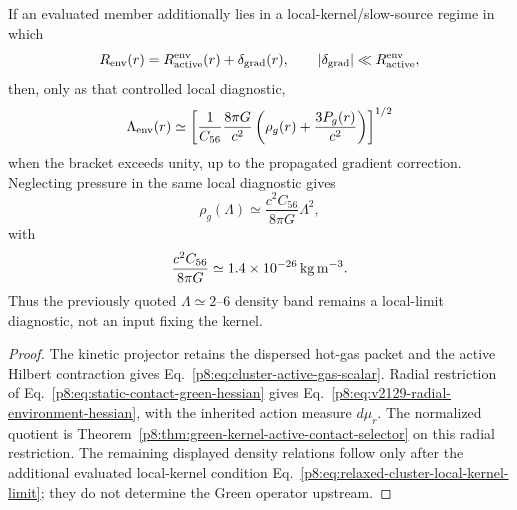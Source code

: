 \documentclass[12pt,a4paper]{article}
\begin{document}
\begin{corollary}
If an evaluated member additionally lies in a local-kernel/slow-source regime
in which
\begin{equation}
\label{p8:eq:relaxed-cluster-local-kernel-limit}
 R_{\rm env}(r)=R_{\rm active}^{\rm env}(r)+\delta_{\rm grad}(r),
 \qquad |\delta_{\rm grad}|\ll R_{\rm active}^{\rm env},
\end{equation}
then, only as that controlled local diagnostic,
\begin{equation}
\label{p8:eq:relaxed-cluster-Lambda-from-gas-density}
 \Lambda_{\rm env}(r)
 \simeq
 \left[\frac{1}{C_{56}}\frac{8\pi G}{c^2}
 \left(\rho_g(r)+\frac{3P_g(r)}{c^2}\right)\right]^{1/2}
\end{equation}
when the bracket exceeds unity, up to the propagated gradient correction.
Neglecting pressure in the same local diagnostic gives
\begin{equation}
\label{p8:eq:rho-cluster-Lambda-conversion}
 \rho_g(\Lambda)\simeq\frac{c^2C_{56}}{8\pi G}\Lambda^2,
\end{equation}
with
\begin{equation}
\label{p8:eq:cluster-density-uplift-scale}
 \frac{c^2C_{56}}{8\pi G}
 \simeq1.4\times10^{-26}\,{\rm kg\,m^{-3}}.
\end{equation}
Thus the previously quoted $\Lambda\simeq2$--$6$ density band remains a
local-limit diagnostic, not an input fixing the kernel.
\end{corollary}

\begin{proof}
The kinetic projector retains the dispersed hot-gas packet and the active
Hilbert contraction gives Eq.~\eqref{p8:eq:cluster-active-gas-scalar}.  Radial
restriction of Eq.~\eqref{p8:eq:static-contact-green-hessian} gives
Eq.~\eqref{p8:eq:v2129-radial-environment-hessian}, with the inherited action
measure $d\mu_r$.  The normalized quotient is
Theorem~\ref{p8:thm:green-kernel-active-contact-selector} on this radial
restriction.  The remaining displayed density relations follow only after the
additional evaluated local-kernel condition
Eq.~\eqref{p8:eq:relaxed-cluster-local-kernel-limit}; they do not determine the
Green operator upstream.
\end{proof}
\end{document}
